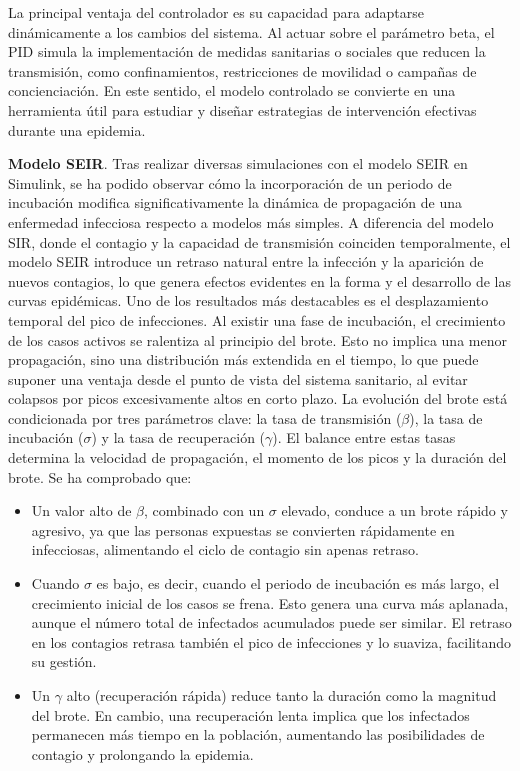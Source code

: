 La principal ventaja del controlador es su capacidad para adaptarse dinámicamente a los cambios del sistema. Al actuar sobre el parámetro beta, el PID simula la implementación de medidas sanitarias o sociales que reducen la transmisión, como confinamientos, restricciones de movilidad o campañas de concienciación. En este sentido, el modelo controlado se convierte en una herramienta útil para estudiar y diseñar estrategias de intervención efectivas durante una epidemia.

\textbf{Modelo SEIR}. Tras realizar diversas simulaciones con el modelo SEIR en Simulink, se ha podido observar cómo la incorporación de un periodo de incubación modifica significativamente la dinámica de propagación de una enfermedad infecciosa respecto a modelos más simples. A diferencia del modelo SIR, donde el contagio y la capacidad de transmisión coinciden temporalmente, el modelo SEIR introduce un retraso natural entre la infección y la aparición de nuevos contagios, lo que genera efectos evidentes en la forma y el desarrollo de las curvas epidémicas.
Uno de los resultados más destacables es el desplazamiento temporal del pico de infecciones. Al existir una fase de incubación, el crecimiento de los casos activos se ralentiza al principio del brote. Esto no implica una menor propagación, sino una distribución más extendida en el tiempo, lo que puede suponer una ventaja desde el punto de vista del sistema sanitario, al evitar colapsos por picos excesivamente altos en corto plazo.
La evolución del brote está condicionada por tres parámetros clave: la tasa de transmisión ($\beta$), la tasa de incubación ($\sigma$) y la tasa de recuperación ($\gamma$). El balance entre estas tasas determina la velocidad de propagación, el momento de los picos y la duración del brote.
Se ha comprobado que:
\begin{itemize}
    \item Un valor alto de $\beta$, combinado con un $\sigma$ elevado, conduce a un brote rápido y agresivo, ya que las personas expuestas se convierten rápidamente en infecciosas, alimentando el ciclo de contagio sin apenas retraso.
    \item Cuando $\sigma$ es bajo, es decir, cuando el periodo de incubación es más largo, el crecimiento inicial de los casos se frena. Esto genera una curva más aplanada, aunque el número total de infectados acumulados puede ser similar. El retraso en los contagios retrasa también el pico de infecciones y lo suaviza, facilitando su gestión.
    \item Un $\gamma$ alto (recuperación rápida) reduce tanto la duración como la magnitud del brote. En cambio, una recuperación lenta implica que los infectados permanecen más tiempo en la población, aumentando las posibilidades de contagio y prolongando la epidemia.
\end{itemize}
